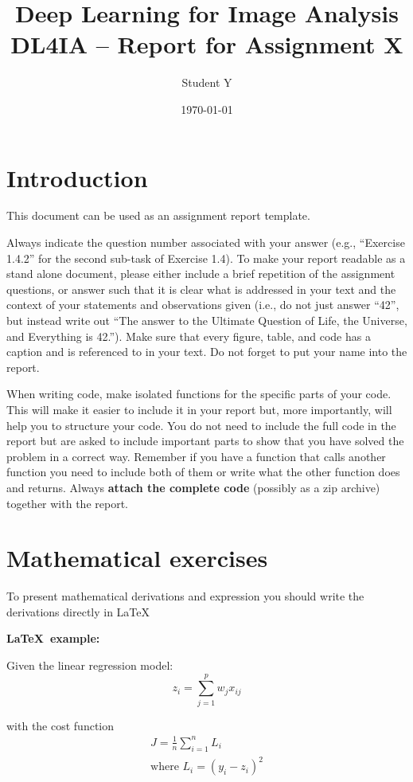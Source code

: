 \documentclass[a4paper,10pt]{article}
\title{\textbf{Deep Learning for Image Analysis} 
\\ DL4IA -- Report for Assignment X}
\author{Student Y}
\date{\today}
\begin{document}
\maketitle

\section{Introduction}

This document can be used as an assignment report template. 

Always indicate the question number associated with your answer (e.g., ``Exercise 1.4.2'' for the second sub-task of Exercise 1.4). To make your report readable as a stand alone document, 
please either include a brief repetition of the assignment questions, or answer such that it is clear what is addressed in your text and the context of your statements and observations given (i.e., do not just answer ``42'', but instead write out ``The answer to the Ultimate Question of Life, the Universe, and Everything is 42.''\cite{Adams}). 
Make sure that every figure, table, and code has a caption and is referenced to in your text. Do not forget to put your name into the report.

When writing code, make isolated functions for the specific parts of your code. This will make it easier to include it in your report but, more importantly, will help you to structure your code. You do not need to include the full code in the report but are asked to include important parts to show that you have solved the problem in a correct way. Remember if you have a function that calls another function you need to include both of them or write what the other function does and returns. Always \textbf{attach the complete code} (possibly as a zip archive) together with the report.

\section{Mathematical exercises}

To present mathematical derivations and expression you should write the derivations directly in \LaTeX\ 

\textbf{\LaTeX\ example:}

Given the linear regression model:
\begin{equation}
    z_i = \sum_{j=1}^p w_jx_{ij} 
\end{equation}

with the cost function 
\begin{equation}
\label{eq:cost}
\begin{split}
    J = \frac{1}{n}\sum_{i=1}^nL_i \\
    \text{where } L_i = (y_i-z_i)^2    
\end{split}
\end{equation}
\end{document}
